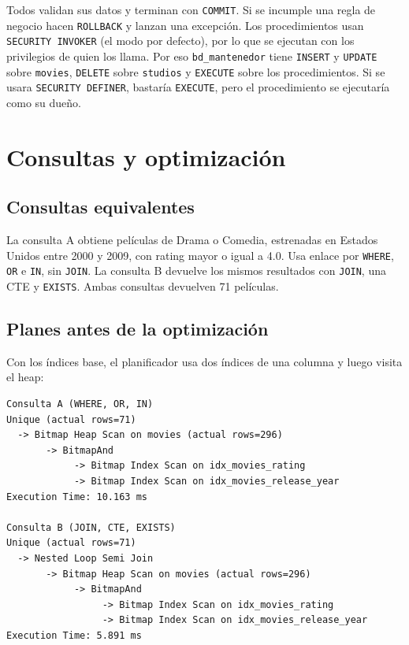 \documentclass[11pt,a4paper]{article}
\begin{document}
Todos validan sus datos y terminan con \texttt{COMMIT}. Si se incumple una regla
de negocio hacen \texttt{ROLLBACK} y lanzan una excepción.
Los procedimientos usan \texttt{SECURITY INVOKER} (el modo por defecto), por lo
que se ejecutan con los privilegios de quien los llama. Por eso
\texttt{bd\_mantenedor} tiene \texttt{INSERT} y \texttt{UPDATE} sobre
\texttt{movies}, \texttt{DELETE} sobre \texttt{studios} y \texttt{EXECUTE} sobre
los procedimientos. Si se usara \texttt{SECURITY DEFINER}, bastaría
\texttt{EXECUTE}, pero el procedimiento se ejecutaría como su dueño.

\section{Consultas y optimización}

\subsection{Consultas equivalentes}

La consulta A obtiene películas de Drama o Comedia, estrenadas en Estados
Unidos entre 2000 y 2009, con rating mayor o igual a 4.0. Usa enlace por
\texttt{WHERE}, \texttt{OR} e \texttt{IN}, sin \texttt{JOIN}. La consulta B
devuelve los mismos resultados con \texttt{JOIN}, una CTE y \texttt{EXISTS}.
Ambas consultas devuelven 71 películas.

\subsection{Planes antes de la optimización}

Con los índices base, el planificador usa dos índices de una columna y luego
visita el heap:

\begin{verbatim}
Consulta A (WHERE, OR, IN)
Unique (actual rows=71)
  -> Bitmap Heap Scan on movies (actual rows=296)
       -> BitmapAnd
            -> Bitmap Index Scan on idx_movies_rating
            -> Bitmap Index Scan on idx_movies_release_year
Execution Time: 10.163 ms

Consulta B (JOIN, CTE, EXISTS)
Unique (actual rows=71)
  -> Nested Loop Semi Join
       -> Bitmap Heap Scan on movies (actual rows=296)
            -> BitmapAnd
                 -> Bitmap Index Scan on idx_movies_rating
                 -> Bitmap Index Scan on idx_movies_release_year
Execution Time: 5.891 ms
\end{verbatim}
\end{document}
